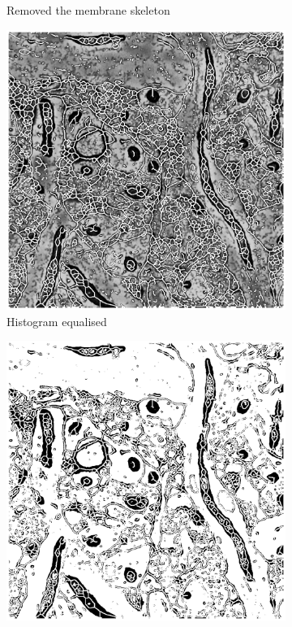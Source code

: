 \documentclass[a4paper, 11pt]{article}
\numberwithin{equation}{section}
\begin{document}
\begin{figure}[!ht]
\begin{subfigure}[t]{.3\textwidth}
				\caption{Removed the membrane skeleton}
			\end{subfigure}
			\quad
			\begin{subfigure}[t]{.3\textwidth}
				\centering
				\includegraphics[width=\textwidth]{7_histeq}
				\caption{Histogram equalised}		
			\end{subfigure}
			\quad
			\begin{subfigure}[t]{.3\textwidth}
				\centering
				\includegraphics[width=\textwidth]{8_threshold}

\end{subfigure}
\end{figure}
\end{document}
